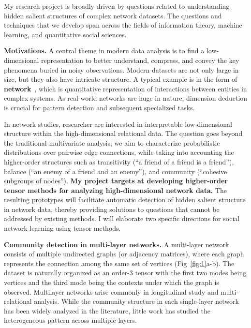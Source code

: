 \documentclass[10pt]{article}
\theoremstyle{plain}
\theoremstyle{definition}
\begin{document}
My research project is broadly driven by questions related to understanding hidden salient structures of complex network datasets. The questions and techniques that we develop span across the fields of information theory, machine learning, and quantitative social sciences. 

{\bf Motivations.} A central theme in modern data analysis is to find a low-dimensional representation to better understand, compress, and convey the key phenomena buried in noisy observations. Modern datasets are not only large in size, but they also have intricate structure. A typical example is in the form of {\bf network}~\cite{bickel2009nonparametric,rohe2011spectra,zheng2019}, which is quantitative representation of interactions between entities in complex systems. As real-world networks are huge in nature, dimension deduction is crucial for pattern detection and subsequent specialized tasks. 

In network studies, researcher are interested in interpretable low-dimensional structure within the high-dimensional relational data. The question goes beyond the traditional multivariate analysis; we aim to characterize probabilistic distributions over pairwise edge connections, while taking into accounting the higher-order structures such as transitivity (``a friend of a friend is a friend''), balance (``an enemy of a friend and an enemy''), and community (``cohesive subgroups of nodes''). {\bf My project targets at developing higher-order tensor methods for analyzing high-dimensional network data.} The resulting prototypes will facilitate automatic detection of hidden salient structure in network data, thereby providing solutions to questions that cannot be addressed by existing methods. I will elaborate two specific directions for social network learning using tensor methods. 

{\bf Community detection in multi-layer networks.}
A multi-layer network consists of multiple undirected graphs (or adjacency matrices), where each graph represents the connection among the same set of vertices (Fig~\ref{fig:1}a-b). The dataset is naturally organized as an order-3 tensor with the first two modes being vertices and the third mode being the contexts under which the graph is observed. Multilayer networks arise commonly in longitudinal study and multi-relational analysis. While the community structure in each single-layer network has been widely analyzed in the literature, little work has studied the heterogeneous pattern across multiple layers. 
\end{document}
